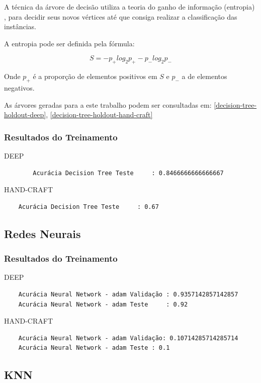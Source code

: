 \documentclass[
article,			%
11pt,				%
oneside,			%
a4paper,			%
english,			%
brazil,				%
sumario=tradicional,
]{abntex2}
\begin{document}
	A técnica da árvore de decisão utiliza a teoria do ganho de informação (entropia) , para decidir seus novos vértices até que consiga realizar a classificação das instâncias.
	
	A entropia pode ser definida pela fórmula:
	
	\begin{equation}
	S = -p_+ log_2 p_+-p_-log_2p_-
	\end{equation}
	
	Onde \(p_+\) é a proporção de elementos positivos em \(S\) e \(p_-\) a de elementos negativos.
	
	 As árvores geradas para a este trabalho podem ser consultadas em: \autoref{decision-tree-holdout-deep}, \autoref{decision-tree-holdout-hand-craft}
	
	\subsubsection{Resultados do Treinamento}
	DEEP
	\begin{verbatim}
		Acurácia Decision Tree Teste     : 0.8466666666666667
	\end{verbatim}
	
	HAND-CRAFT
	\begin{verbatim}
	Acurácia Decision Tree Teste     : 0.67
	\end{verbatim}
	
	\subsection{Redes Neurais}
	
	\subsubsection{Resultados do Treinamento}
	DEEP
	\begin{verbatim}
	Acurácia Neural Network - adam Validação : 0.9357142857142857
	Acurácia Neural Network - adam Teste     : 0.92
	\end{verbatim}
	
	HAND-CRAFT
	\begin{verbatim}
	Acurácia Neural Network - adam Validação: 0.10714285714285714
	Acurácia Neural Network - adam Teste : 0.1
	\end{verbatim}
	
	\subsection{KNN}
	
\end{document}

